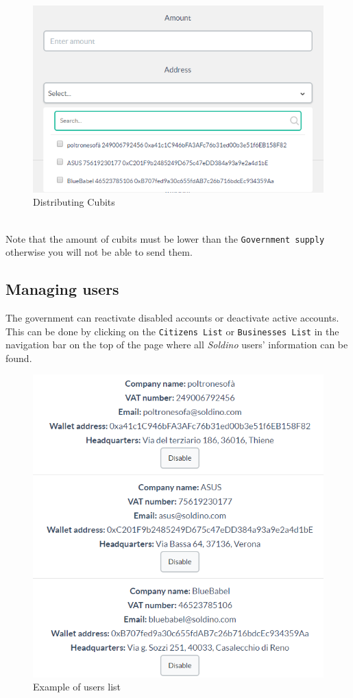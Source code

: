		\begin{figure}[H]
			\includegraphics[width=15cm]{res/images/distributing.png}
			\centering
			\caption{Distributing Cubits}
		\end{figure} \mbox{}\\

		\noindent Note that the amount of cubits must be lower than the \texttt{Government  
		supply} otherwise you will not be able to send them.
	\subsection{Managing users}
	The government can reactivate disabled accounts or deactivate active accounts.
	This can be done by clicking on the \texttt{Citizens List} or \texttt{Businesses List}
	in the navigation bar on the top of the page where all \textit{Soldino} users' information can be found.

	\begin{figure}[H]
		\includegraphics[width=13cm]{res/images/users_list.png}
		\centering
		\caption{Example of users list}
	\end{figure}

